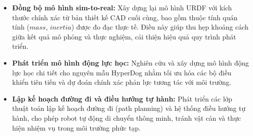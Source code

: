 \begin{itemize}
    \item \textbf{Đồng bộ mô hình sim-to-real:} Xây dựng lại mô hình URDF với kích thước chính xác từ bản thiết kế CAD cuối cùng, bao gồm thuộc tính quán tính ($mass$, $inertia$) được đo đạc thực tế. Điều này giúp thu hẹp khoảng cách giữa kết quả mô phỏng và thực nghiệm, cải thiện hiệu quả quy trình phát triển.

    \item \textbf{Phát triển mô hình động lực học:} Nghiên cứu và xây dựng mô hình động lực học chi tiết cho nguyên mẫu HyperDog nhằm tối ưu hóa các bộ điều khiển tiên tiến và dự đoán chính xác phản lực tương tác với môi trường.

    \item \textbf{Lập kế hoạch đường đi và điều hướng tự hành:} Phát triển các lớp thuật toán lập kế hoạch đường đi (path planning) và hệ thống điều hướng tự hành, cho phép robot tự động di chuyển thông minh, tránh vật cản và thực hiện nhiệm vụ trong môi trường phức tạp.
\end{itemize}

